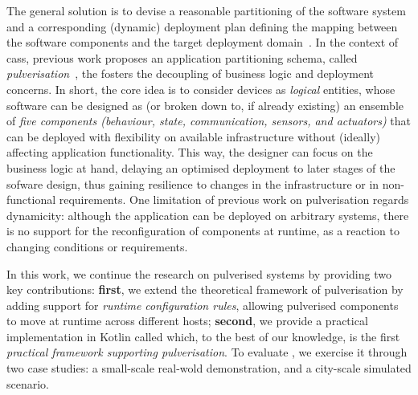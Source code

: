 \documentclass[conference]{IEEEtran}
\newcommand{\meta}[1]{{\color{blue}#1}}
\begin{document}
The general solution is to devise 
 a reasonable partitioning of the software system
 and a corresponding (dynamic) deployment plan 
 defining the mapping between the software components and the target deployment domain~\cite{DBLP:journals/jss/ArcangeliBL15}.
%
In the context of \acp{cas},
 previous work proposes an application partitioning schema,
 called \emph{pulverisation}~\cite{FI2020-pulverization},
 the fosters the decoupling of business logic and deployment concerns.
%
In short, the core idea is to consider devices as \emph{logical} entities,
whose software can be designed as (or broken down to, if already existing) an ensemble of \emph{five components
(behaviour, state, communication, sensors, and actuators)}
 that can be deployed with flexibility on available infrastructure without (ideally) affecting application functionality. %
%
This way, the designer can focus on the business logic at hand,
delaying an optimised deployment to later stages of the sofware design,
thus gaining resilience to changes in the infrastructure or in non-functional requirements.
%
One limitation of previous work on pulverisation regards dynamicity:
although the application can be deployed on arbitrary systems,
there is no support for the reconfiguration of components at runtime, as a reaction to changing conditions or requirements.

In this work,
we continue the research on pulverised systems by providing two key contributions:
\textbf{first}, we extend the theoretical framework of pulverisation by adding support for
\emph{runtime configuration rules}, allowing pulverised components to move at runtime across different hosts;
\textbf{second}, we provide a practical implementation in Kotlin called \emph{\ourframework{}} which,
to the best of our knowledge,
is the first \emph{practical framework supporting pulverisation}. %
%
To evaluate \ourframework{}, we exercise it through two case studies:
a small-scale real-wold demonstration, and a city-scale simulated scenario.

\end{document}
